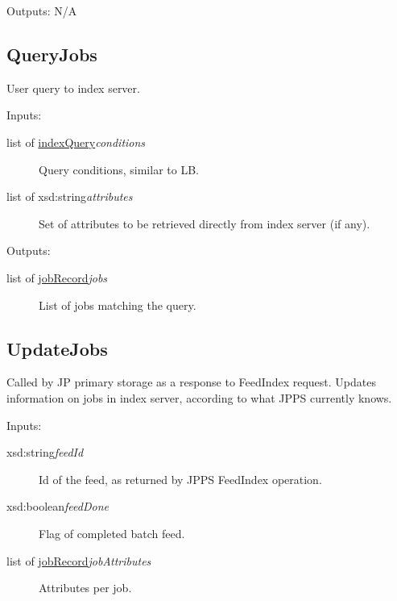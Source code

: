 Outputs: N/A
\subsection{QueryJobs}
\label{op:QueryJobs}\hypertarget{op:QueryJobs}{}%

User query to index server.

Inputs: 
\begin{description}
\item[{list of \hyperlink{type:indexQuery}{indexQuery}{\ttfamily\itshape{{conditions}}}}]\null{}
Query conditions, similar to LB.
\item[{list of xsd:string{\ttfamily\itshape{{attributes}}}}]\null{}
Set of attributes to be retrieved directly from index server (if any).
\end{description}
\noindent 

Outputs: 
\begin{description}
\item[{list of \hyperlink{type:jobRecord}{jobRecord}{\ttfamily\itshape{{jobs}}}}]\null{}
List of jobs matching the query.
\end{description}
\noindent 
\subsection{UpdateJobs}
\label{op:UpdateJobs}\hypertarget{op:UpdateJobs}{}%

Called by JP primary storage as a response to FeedIndex request. Updates information on jobs in index server, according to what JPPS currently knows.

Inputs: 
\begin{description}
\item[{xsd:string{\ttfamily\itshape{{feedId}}}}]\null{}
Id of the feed, as returned by JPPS FeedIndex operation.
\item[{xsd:boolean{\ttfamily\itshape{{feedDone}}}}]\null{}
Flag of completed batch feed.
\item[{list of \hyperlink{type:jobRecord}{jobRecord}{\ttfamily\itshape{{jobAttributes}}}}]\null{}
Attributes per job.
\end{description}
\noindent 

